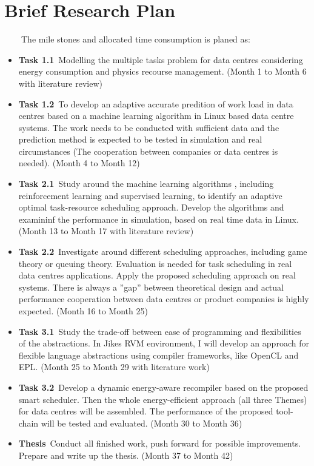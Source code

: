 \section{Brief Research Plan}
\label{sec:timetable}
~~~~The mile stones and allocated time consumption is planed as:
\begin{itemize}
\item
\textbf{Task 1.1}~Modelling the multiple tasks problem for data centres considering energy consumption and physics recourse management. (Month 1 to Month 6 with literature review)
\item
\textbf{Task 1.2}~To develop an adaptive accurate predition of work load in data centres based on a machine learning algorithm in Linux based data centre systems. The work needs to be conducted with sufficient data and the prediction method is expected to be tested in simulation and real circumstances (The cooperation between companies or data centres is needed). (Month 4 to Month 12)
\item
\textbf{Task 2.1}~Study around the machine learning algorithms \cite{ma}, including reinforcement learning and supervised learning, to identify an adaptive optimal task-resource scheduling approach. Develop the algorithms and examininf the performance in simulation, based on real time data in Linux. (Month 13 to Month 17 with literature review)
\item
\textbf{Task 2.2}~Investigate around different scheduling approaches, including game theory or queuing theory. Evaluation is needed for task scheduling in real data centres applications. Apply the proposed scheduling approach on real systems. There is always a ”gap” between theoretical design and actual performance cooperation between data centres or product companies is highly expected. (Month 16 to Month 25)
\item
\textbf{Task 3.1}~Study the trade-off between ease of programming and flexibilities of the abstractions. In Jikes RVM environment, I will develop an approach for flexible language abstractions using compiler frameworks, like OpenCL and EPL. (Month 25 to Month 29 with literature work)
\item
\textbf{Task 3.2}~Develop a dynamic energy-aware recompiler based on the proposed smart scheduler. Then the whole energy-efficient approach (all three Themes) for data centres will be assembled. The performance of the proposed tool-chain will be tested and evaluated. (Month 30 to Month 36) 
\item
\textbf{Thesis}~Conduct all finished work, push forward for possible improvements. Prepare and write up the thesis. (Month 37 to Month 42)
\end{itemize}
